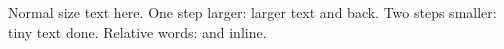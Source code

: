 \documentclass{article}
\begin{document}
Normal size text here.
One step larger: {\larger larger text} and back.
Two steps smaller: {\smaller[2] tiny text} done.
Relative words:  and  inline.
\end{document}
